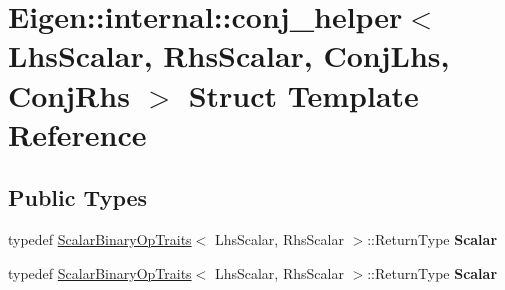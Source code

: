 \hypertarget{struct_eigen_1_1internal_1_1conj__helper}{}\section{Eigen\+:\+:internal\+:\+:conj\+\_\+helper$<$ Lhs\+Scalar, Rhs\+Scalar, Conj\+Lhs, Conj\+Rhs $>$ Struct Template Reference}
\label{struct_eigen_1_1internal_1_1conj__helper}
\subsection*{Public Types}
\begin{DoxyCompactItemize}
\item 
\mbox{\label{struct_eigen_1_1internal_1_1conj__helper_a261dd08a57eefe6d7b44327472ec7c07}} 
typedef \hyperlink{group___core___module_struct_eigen_1_1_scalar_binary_op_traits}{Scalar\+Binary\+Op\+Traits}$<$ Lhs\+Scalar, Rhs\+Scalar $>$\+::Return\+Type {\bfseries Scalar}
\item 
\mbox{\label{struct_eigen_1_1internal_1_1conj__helper_a261dd08a57eefe6d7b44327472ec7c07}} 
typedef \hyperlink{group___core___module_struct_eigen_1_1_scalar_binary_op_traits}{Scalar\+Binary\+Op\+Traits}$<$ Lhs\+Scalar, Rhs\+Scalar $>$\+::Return\+Type {\bfseries Scalar}
\end{DoxyCompactItemize}

